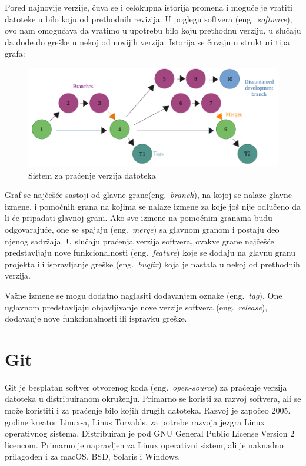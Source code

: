 \documentclass[12pt]{report}
\begin{document}
Pored najnovije verzije, čuva se i celokupna istorija promena i moguće je vratiti datoteke u bilo koju od prethodnih revizija. U poglegu softvera (eng.\ \textit{software}), ovo nam omogućava da vratimo u upotrebu bilo koju prethodnu verziju, u slučaju da dođe do greške u nekoj od novijih verzija. Istorija se čuvaju u strukturi tipa grafa:

\begin{figure}[H]
    \includegraphics[width=\linewidth]{images/version_control.png}
    \caption{Sistem za praćenje verzija datoteka}
\end{figure}

Graf se najčešće sastoji od glavne grane(eng.\ \textit{branch}), na kojoj se nalaze glavne izmene, i pomoćnih grana na kojima se nalaze izmene za koje još nije odlučeno da li će pripadati glavnoj grani. Ako sve izmene na pomoćnim granama budu odgovarajuće, one se spajaju (eng.\ \textit{merge}) sa glavnom granom i postaju deo njenog sadržaja. U slučaju praćenja verzija softvera, ovakve grane najčešće predstavljaju nove funkcionalnosti (eng.\ \textit{feature}) koje se dodaju na glavnu granu projekta ili ispravljanje greške (eng.\ \textit{bugfix}) koja je nastala u nekoj od prethodnih verzija.

Važne izmene se mogu dodatno naglasiti dodavanjem oznake (eng.\ \textit{tag}). One uglavnom predstavljaju objavljivanje nove verzije softvera (eng.\ \textit{release}), dodavanje nove funkcionalnosti ili ispravku greške.

\section{Git}
Git \cite{git} je besplatan softver otvorenog koda (eng.\ \textit{open-source}) za praćenje verzija datoteka u distribuiranom okruženju. Primarno se koristi za razvoj softvera, ali se može koristiti i za praćenje bilo kojih drugih datoteka. Razvoj je započeo 2005. godine kreator Linux-a, Linus Torvalds, za potrebe razvoja jezgra Linux operativnog sistema. Distribuiran je pod GNU General Public License Version 2 licencom. Primarno je napravljen za Linux operativni sistem, ali je naknadno prilagođen i za macOS, BSD, Solaris i Windows.
\end{document}
